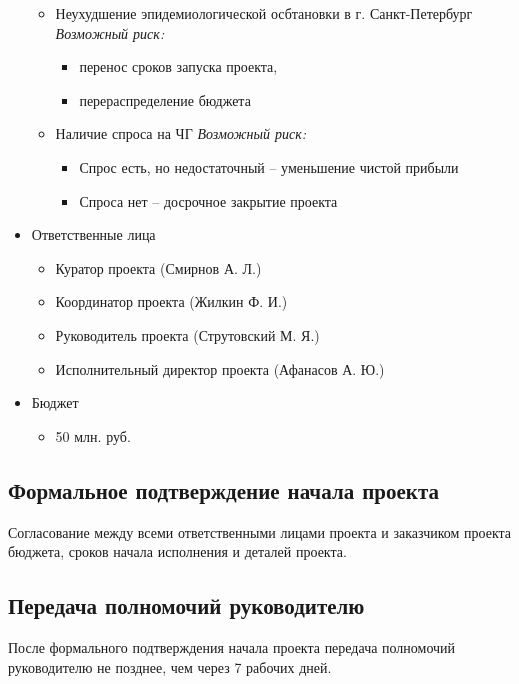\documentclass[a4paper,8pt]{article}
\begin{document}
\begin{itemize}
\begin{itemize}
            \item Неухудшение эпидемиологической осбтановки в г. Санкт-Петербург \newline
            \textit{Возможный риск:} 
            \begin{itemize}
                \item перенос сроков запуска проекта,
                \item перераспределение бюджета
            \end{itemize}  
            \item Наличие спроса на ЧГ \newline
            \textit{Возможный риск:}
            \begin{itemize}
                \item Спрос есть, но недостаточный -- уменьшение чистой прибыли
                \item Спроса нет -- досрочное закрытие проекта
            \end{itemize}
        \end{itemize}
    \item Ответственные лица
        \begin{itemize}
            \item Куратор проекта (Смирнов А. Л.)
            \item Координатор проекта (Жилкин Ф. И.)
            \item Руководитель проекта (Струтовский М. Я.)
            \item Исполнительный директор проекта (Афанасов А. Ю.)
        \end{itemize}
    \item Бюджет
        \begin{itemize}
            \item 50 млн. руб.
        \end{itemize}
\end{itemize}
\subsection{Формальное подтверждение начала проекта}
Согласование между всеми ответственными лицами проекта и заказчиком проекта бюджета, сроков начала исполнения и деталей проекта.
\subsection{Передача полномочий руководителю}
После формального подтверждения начала проекта передача полномочий руководителю не позднее, чем через 7 рабочих дней.
\end{document}
